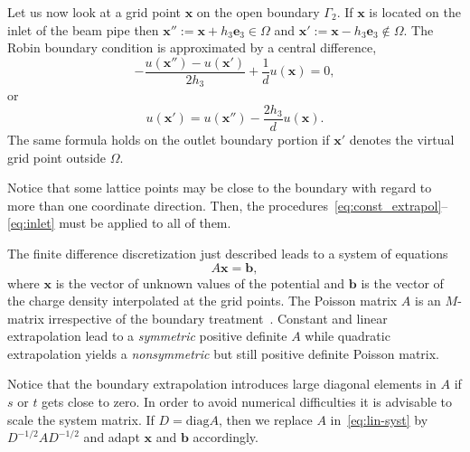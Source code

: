 Let us now look at a grid point $\mathbf{x}$ on the open boundary
$\Gamma_2$.  If $\mathbf{x}$ is located on the inlet of the beam pipe
then $\mathbf{x}'':=\mathbf{x}\! +\! h_3\mathbf{e}_3 \in \Omega$ and
$\mathbf{x}':=\mathbf{x}\! -\! h_3\mathbf{e}_3 \not\in \Omega$.  The
Robin boundary condition is approximated by a central difference,
\begin{displaymath}
  - \frac{u(\mathbf{x}'') - u(\mathbf{x}')}{2h_3}
  + \frac{1}{d}u(\mathbf{x}) = 0,
\end{displaymath}
or
\begin{equation}  \label{eq:inlet}
  u(\mathbf{x}') = u(\mathbf{x}'') - \frac{2h_3}{d}u(\mathbf{x}).
\end{equation}
The same formula holds on the outlet boundary portion if $\mathbf{x}'$
denotes the virtual grid point outside $\Omega$.

Notice that some lattice points may be close to the boundary with regard
to more than one coordinate direction.  Then, the
procedures~\eqref{eq:const_extrapol}--\eqref{eq:inlet} must be
applied to all of them.  

The finite difference discretization just described leads to a system of
equations
\begin{equation} \label{eq:lin-syst}
  A \mathbf{x} = \mathbf{b},
\end{equation}
where $\mathbf{x}$ is the vector of unknown values of the potential and
$\mathbf{b}$ is the vector of the charge density interpolated at the grid
points.
The Poisson matrix $A$ is an $M$-matrix irrespective of the boundary
treatment~\cite{hack:94}.  Constant and linear extrapolation lead to a
\emph{symmetric} positive definite $A$ while quadratic extrapolation
yields a \emph{nonsymmetric} but still positive definite Poisson matrix.

Notice that the boundary extrapolation introduces large diagonal
elements in $A$ if $s$ or $t$ gets close to zero.  In order to avoid
numerical difficulties it is advisable to scale the system matrix.  If
$D = \mbox{diag}{A}$, then we replace $A$ in~\eqref{eq:lin-syst} by
$D^{-1/2} A D^{-1/2}$ and adapt $\mathbf{x}$ and $\mathbf{b}$
accordingly.  



